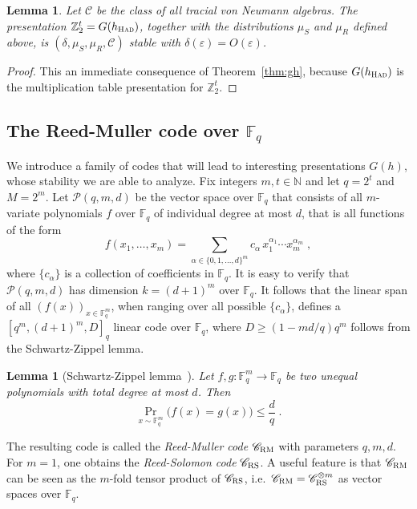 \documentclass[11pt]{article}
\newtheorem{lemma}[theorem]{Lemma}
\theoremstyle{definition}
\newcommand{\code}{\mathscr{C}}
\newcommand{\N}{\ensuremath{\mathbb{N}}}
\newcommand{\F}{\ensuremath{\mathbb{F}}}
\newcommand{\Z}{\ensuremath{\mathbb{Z}}}
\newcommand{\mC}{\ensuremath{\mathcal{C}}}
\newcommand{\mP}{\ensuremath{\mathcal{P}}}
\newcommand{\RM}{\ensuremath{\textsc{RM}}}
\newcommand{\RS}{\ensuremath{\textsc{RS}}}
\newcommand{\had}{\textsc{Had}}
\newcommand{\eps}{\varepsilon}
\begin{document}
\begin{lemma}\label{lem:had-stab}
Let $\mC$ be the class of all tracial von Neumann algebras. 
The presentation $\Z_2^t= G(h_\had)$, together with the distributions $\mu_S$ and $\mu_R$ defined above, is $(\delta,\mu_S,\mu_R,\mC)$ stable with $\delta(\eps)=O(\eps)$. 
\end{lemma}

\begin{proof}
This an immediate consequence of Theorem~\ref{thm:gh}, because $G(h_\had)$ is the multiplication table presentation for $\Z_2^t$.
\end{proof}



\subsection{The Reed-Muller code over $\F_q$}
\label{sec:rmq}

We introduce a family of codes that will lead to interesting presentations $G(h)$, whose stability we are able to analyze.
Fix integers $m,t \in \N$ and let $q=2^t$ and $M = 2^m$. Let $\mP(q,m,d)$ be the vector space over $\F_q$ that consists of all $m$-variate polynomials $f$ over $\F_q$ of individual degree at most $d$, that is all functions of the form
\[
	f(x_1,\ldots,x_m) = \sum_{\alpha \in \{0,1,\ldots,d\}^m} c_\alpha\,
  x_1^{\alpha_1} \cdots x_m^{\alpha_m}\;,
\]
where $\{c_\alpha\}$ is a collection of coefficients in $\F_q$. It is easy to verify that $\mP(q,m,d)$ has dimension $k = (d+1)^m$ over $\F_q$. It follows that the linear span of all $(f(x))_{x\in \F_q^m}$, when ranging over all possible $\{c_\alpha\}$, defines a $[q^m,(d+1)^m,D]_q$ linear code over $\F_q$, where $D\geq (1-md/q)q^m$ follows from the Schwartz-Zippel lemma.

\begin{lemma}[Schwartz-Zippel lemma~\cite{Sch80,Zip79}]
  \label{lem:schwartz-zippel}
  Let $f, g: \F_q^m \to \F_q$ be two unequal polynomials with total degree at most $d$. Then
  \begin{equation*}
    \Pr_{x \sim \F_q^m}\big(f(x) = g(x)\big) \leq \frac{d}{q}\;.
  \end{equation*}
\end{lemma}

The resulting code is called the \emph{Reed-Muller code} $\code_\RM$ with parameters $q,m,d$. For $m=1$, one obtains the \emph{Reed-Solomon code} $\code_\RS$. A useful feature is that $\code_\RM$ can be seen as the $m$-fold tensor product of $\code_\RS$, i.e.\ $\code_\RM = \code_\RS^{\otimes m}$ as vector spaces over $\F_q$. 
\end{document}
